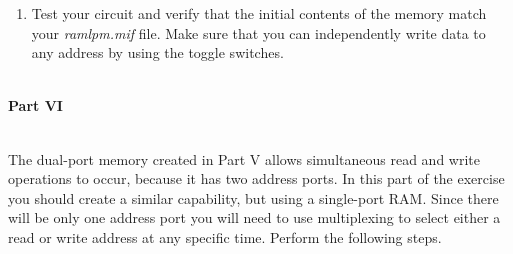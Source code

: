 \documentclass[psfig,10pt,fullpage]{article}
\begin{document}
\begin{enumerate}
\item Test your circuit and verify that the initial contents of the memory match
your {\it ramlpm.mif} file. Make sure that you can independently write data to any
address by using the toggle switches.
\end{enumerate}

~\\
\noindent
{\bf Part VI}

~\\
\noindent
The dual-port memory created in Part V allows simultaneous read and write operations to
occur, because it has two address ports. In this part of the exercise you should create a
similar capability, but using a single-port RAM. Since there will be only one address port
you will need to use multiplexing to select either a read or write address at any specific
time. Perform the following steps.
\end{document}
